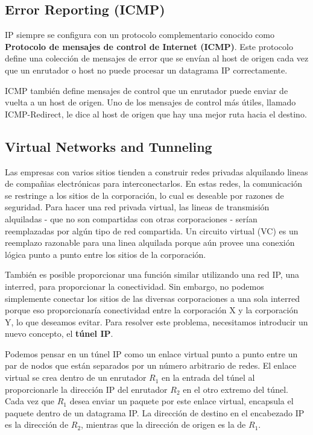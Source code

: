 \subsection{Error Reporting (ICMP)}
IP siempre se configura con un protocolo complementario conocido como \textbf{Protocolo de mensajes de control de Internet (ICMP)}. Este protocolo define una colección de mensajes de error que se envían al host de origen cada vez que un enrutador o host no puede procesar un datagrama IP correctamente.

ICMP también define mensajes de control que un enrutador puede enviar de vuelta a un host de origen. Uno de los mensajes de control más útiles, llamado ICMP-Redirect, le dice al host de origen que hay una mejor ruta hacia el destino.

\subsection{Virtual Networks and Tunneling}

Las empresas con varios sitios tienden a construir redes privadas alquilando lineas de compañias electrónicas para interconectarlos. En estas redes, la comunicación se restringe a los sitios de la corporación, lo cual es deseable por razones de seguridad. Para hacer una red privada virtual, las lineas de transmisión alquiladas - que no son compartidas con otras corporaciones - serían reemplazadas por algún tipo de red compartida. Un circuito virtual (VC) es un reemplazo razonable para una linea alquilada porque aún provee una conexión lógica punto a punto entre los sitios de la corporación.

También es posible proporcionar una función similar utilizando una red IP, una interred, para proporcionar la conectividad. Sin embargo, no podemos simplemente conectar los sitios de las diversas corporaciones a una sola interred porque eso proporcionaría conectividad entre la corporación X y la corporación Y, lo que deseamos evitar. Para resolver este problema, necesitamos introducir un nuevo concepto, el \textbf{túnel IP}.

Podemos pensar en un túnel IP como un enlace virtual punto a punto entre un par de nodos que están separados por un número arbitrario de redes. El enlace virtual se crea dentro de un enrutador \(R_1\) en la entrada del túnel al proporcionarle la dirección IP del enrutador \(R_2\) en el otro extremo del túnel. Cada vez que \(R_1\) desea enviar un paquete por este enlace virtual, encapsula el paquete dentro de un datagrama IP. La dirección de destino en el encabezado IP es la dirección de \(R_2\), mientras que la dirección de origen es la de \(R_1\).

